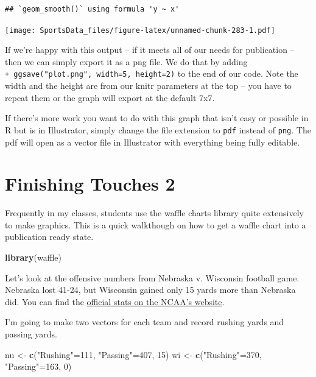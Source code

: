 \documentclass[
]{book}
\newenvironment{Shaded}{\begin{snugshade}}{\end{snugshade}}
\newcommand{\DecValTok}[1]{\textcolor[rgb]{0.00,0.00,0.81}{#1}}
\newcommand{\KeywordTok}[1]{\textcolor[rgb]{0.13,0.29,0.53}{\textbf{#1}}}
\newcommand{\NormalTok}[1]{#1}
\newcommand{\StringTok}[1]{\textcolor[rgb]{0.31,0.60,0.02}{#1}}
\begin{document}
\begin{verbatim}
## `geom_smooth()` using formula 'y ~ x'
\end{verbatim}

\texttt{[image: SportsData\_files/figure-latex/unnamed-chunk-283-1.pdf]}

If we're happy with this output -- if it meets all of our needs for publication -- then we can simply export it as a png file. We do that by adding \texttt{+\ ggsave("plot.png",\ width=5,\ height=2)} to the end of our code. Note the width and the height are from our knitr parameters at the top -- you have to repeat them or the graph will export at the default 7x7.

If there's more work you want to do with this graph that isn't easy or possible in R but is in Illustrator, simply change the file extension to \texttt{pdf} instead of \texttt{png}. The pdf will open as a vector file in Illustrator with everything being fully editable.

\hypertarget{finishing-touches-2}{%
\chapter{Finishing Touches 2}\label{finishing-touches-2}}

Frequently in my classes, students use the waffle charts library quite extensively to make graphics. This is a quick walkthough on how to get a waffle chart into a publication ready state.

\begin{Shaded}
\begin{Highlighting}[]
\KeywordTok{library}\NormalTok{(waffle)}
\end{Highlighting}
\end{Shaded}

Let's look at the offensive numbers from Nebraska v. Wisconsin football game. Nebraska lost 41-24, but Wisconsin gained only 15 yards more than Nebraska did. You can find the \href{https://www.ncaa.com/game/football/fbs/2018/10/06/nebraska-wisconsin/team-stats}{official stats on the NCAA's website}.

I'm going to make two vectors for each team and record rushing yards and passing yards.

\begin{Shaded}
\begin{Highlighting}[]
\NormalTok{nu <-}\StringTok{ }\KeywordTok{c}\NormalTok{(}\StringTok{"Rushing"}\NormalTok{=}\DecValTok{111}\NormalTok{, }\StringTok{"Passing"}\NormalTok{=}\DecValTok{407}\NormalTok{, }\DecValTok{15}\NormalTok{)}
\NormalTok{wi <-}\StringTok{ }\KeywordTok{c}\NormalTok{(}\StringTok{"Rushing"}\NormalTok{=}\DecValTok{370}\NormalTok{, }\StringTok{"Passing"}\NormalTok{=}\DecValTok{163}\NormalTok{, }\DecValTok{0}\NormalTok{)}
\end{Highlighting}
\end{Shaded}
\end{document}
